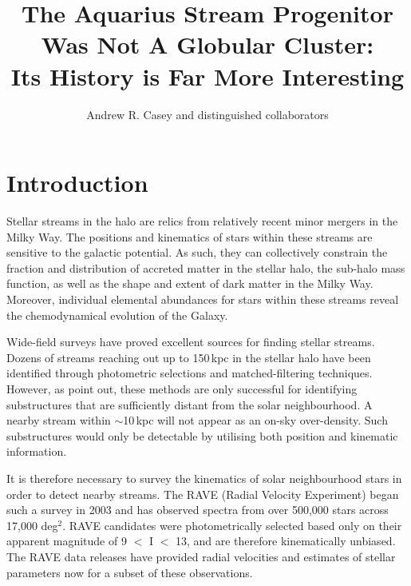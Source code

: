 \documentclass{emulateapj}
\begin{document}
\title{The Aquarius Stream Progenitor Was Not A Globular Cluster: \\ Its History is Far More Interesting}


\author{Andrew R. Casey and distinguished collaborators}


\begin{abstract}
\end{abstract}


\section{Introduction}

Stellar streams in the halo are relics from relatively recent minor mergers in the Milky Way. The positions and kinematics of stars within these streams are sensitive to the galactic potential. As such, they can collectively constrain the fraction and distribution of accreted matter in the stellar halo, the sub-halo mass function, as well as the shape and extent of dark matter in the Milky Way. Moreover, individual elemental abundances for stars within these streams reveal the chemodynamical evolution of the Galaxy. 

Wide-field surveys have proved excellent sources for finding stellar streams. Dozens of streams reaching out up to 150\,kpc in the stellar halo have been identified through photometric selections and matched-filtering techniques. However, as \citet{Helmi;White_1999} point out, these methods are only successful for identifying substructures that are sufficiently distant from the solar neighbourhood. A nearby stream within $\sim{}$10\,kpc will not appear as an on-sky over-density. Such substructures would only be detectable by utilising both position and kinematic information. 

It is therefore necessary to survey the kinematics of solar neighbourhood stars in order to detect nearby streams. The RAVE (Radial Velocity Experiment) began such a survey in 2003 and has observed spectra from over 500,000 stars across 17,000 deg$^{2}$. RAVE candidates were photometrically selected based only on their apparent magnitude of 9 $<$ I $<$ 13, and are therefore kinematically unbiased. The RAVE data releases have provided radial velocities \citep{steinmetz;et-al_2006} and estimates of stellar parameters \citep{zwitter;et-al_2008, siebert;et-al_2011} now for a subset of these observations. 
\end{document}
